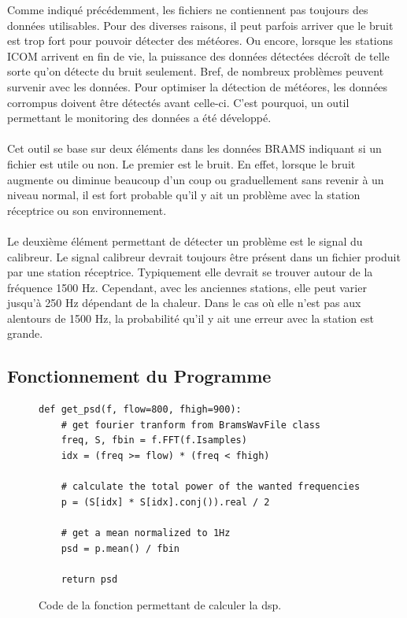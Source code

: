 \documentclass[11pt]{article}
\begin{document}
Comme indiqué précédemment, les fichiers ne contiennent pas toujours des données utilisables.
Pour des diverses raisons, il peut parfois arriver que le bruit est trop fort pour pouvoir détecter des météores.
Ou encore, lorsque les stations ICOM arrivent en fin de vie, la puissance des données détectées décroît de telle sorte qu'on détecte du bruit seulement.
Bref, de nombreux problèmes peuvent survenir avec les données.
Pour optimiser la détection de météores, les données corrompus doivent être détectés avant celle-ci.
C'est pourquoi, un outil permettant le monitoring des données a été développé.\\
\\
Cet outil se base sur deux éléments dans les données BRAMS indiquant si un fichier est utile ou non.
Le premier est le bruit.
En effet, lorsque le bruit augmente ou diminue beaucoup d'un coup ou graduellement sans revenir à un niveau normal, il est fort probable qu'il y ait un problème avec la station réceptrice ou son environnement.\\
\\
Le deuxième élément permettant de détecter un problème est le signal du calibreur.
Le signal calibreur devrait toujours être présent dans un fichier produit par une station réceptrice.
Typiquement elle devrait se trouver autour de la fréquence 1500 Hz.
Cependant, avec les anciennes stations, elle peut varier jusqu'à 250 Hz dépendant de la chaleur.
Dans le cas où elle n'est pas aux alentours de 1500 Hz, la probabilité qu'il y ait une erreur avec la station est grande.

\subsection{Fonctionnement du Programme}

\begin{figure}
    \begin{lstlisting}[style=CStyle]
def get_psd(f, flow=800, fhigh=900):
    # get fourier tranform from BramsWavFile class
    freq, S, fbin = f.FFT(f.Isamples)
    idx = (freq >= flow) * (freq < fhigh)

    # calculate the total power of the wanted frequencies
    p = (S[idx] * S[idx].conj()).real / 2

    # get a mean normalized to 1Hz
    psd = p.mean() / fbin

    return psd
    \end{lstlisting}
    \caption{Code de la fonction permettant de calculer la dsp.}
\end{figure}
\end{document}
